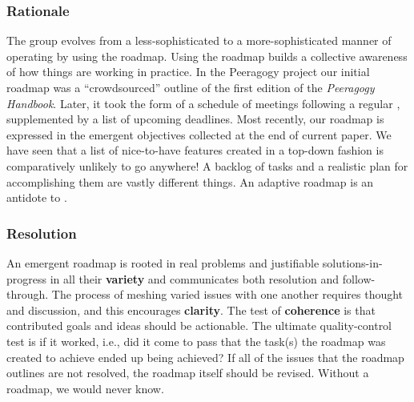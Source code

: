 \subsubsection*{Rationale} 
The group evolves from a less-sophisticated to a more-sophisticated
manner of operating by using the roadmap.  Using
the roadmap builds a collective awareness of how things are working in practice.  In the
Peeragogy project our initial roadmap was a ``crowdsourced'' outline
of the first edition of the \emph{Peeragogy Handbook}.  Later, it took
the form of a schedule of meetings following a regular
, supplemented by a list of upcoming deadlines.
Most recently, our roadmap is expressed in the emergent objectives
collected at the end of current paper.  We have seen that a list of
nice-to-have features created in a top-down fashion is comparatively
unlikely to go anywhere!  A backlog of tasks and a realistic
plan for accomplishing them are vastly different things.  An adaptive
roadmap is an antidote to 
\cite[pp.~121--124]{david2001software}.

\subsubsection*{Resolution}
An emergent roadmap is rooted in real problems and justifiable
solutions-in-progress in all their \textbf{variety} and communicates
both resolution and follow-through.  The process of meshing varied
issues with one another requires thought and discussion, and this
encourages \textbf{clarity}.  The test of \textbf{coherence} is that
contributed goals and ideas should be actionable.
%
The ultimate quality-control test is if it worked, i.e., did it come to pass that the task(s) the roadmap was created to achieve ended up being achieved?  If all of the issues that the roadmap outlines are not resolved, the roadmap itself should be revised. Without a roadmap, we would never know.

